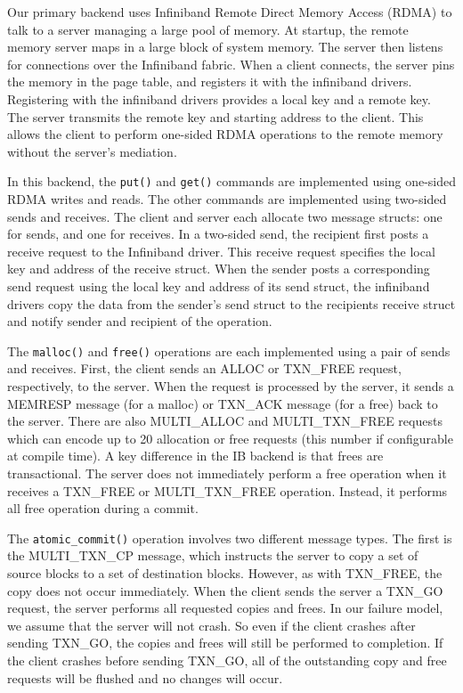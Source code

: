 Our primary backend uses Infiniband Remote Direct Memory Access (RDMA) to talk
to a server managing a large pool of memory. At startup, the remote memory
server maps in a large block of system memory. The server then listens for
connections over the Infiniband fabric. When a client connects, the server
pins the memory in the page table, and registers it with the infiniband drivers.
Registering with the infiniband drivers provides a local key and a remote key.
The server transmits the remote key and starting address to the client.
This allows the client to perform one-sided RDMA operations to the remote
memory without the server's mediation.

In this backend, the \texttt{put()} and \texttt{get()} commands are implemented
using one-sided RDMA writes and reads. The other commands are implemented
using two-sided sends and receives. The client and server each allocate two
message structs: one for sends, and one for receives. In a two-sided send, the
recipient first posts a receive request to the Infiniband driver. This receive
request specifies the local key and address of the receive struct. When the
sender posts a corresponding send request using the local key and address of
its send struct, the infiniband drivers copy the data from the sender's send
struct to the recipients receive struct and notify sender and recipient of the
operation.

The \texttt{malloc()} and \texttt{free()} operations are each implemented using
a pair of sends and receives. First, the client sends an ALLOC or TXN\_FREE
request, respectively, to the server. When the request is processed by the
server, it sends a MEMRESP message (for a malloc) or TXN\_ACK message
(for a free) back to the server. There are also MULTI\_ALLOC and
MULTI\_TXN\_FREE requests which can encode up to 20 allocation or free requests
(this number if configurable at compile time). A key difference in the IB
backend is that frees are transactional. The server does not immediately
perform a free operation when it receives a TXN\_FREE or MULTI\_TXN\_FREE
operation. Instead, it performs all free operation during a commit.

The \texttt{atomic\_commit()} operation involves two different message types.
The first is the MULTI\_TXN\_CP message, which instructs the server to copy
a set of source blocks to a set of destination blocks. However, as with
TXN\_FREE, the copy does not occur immediately. When the client sends the
server a TXN\_GO request, the server performs all requested copies and frees.
In our failure model, we assume that the server will not crash. So even if
the client crashes after sending TXN\_GO, the copies and frees will still be
performed to completion. If the client crashes before sending TXN\_GO, all
of the outstanding copy and free requests will be flushed and no changes will
occur.
